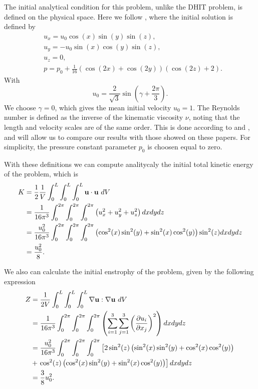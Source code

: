 The initial analytical condition for this problem, unlike the DHIT problem, is defined on the physical space. Here we follow \cite{gassner_accuracy_????}, where the initial solution is defined by
\begin{align}
\label{eq-TGV_initial_condition}
&u_x=u_0\cos(x)\sin(y)\sin(z),\\\nonumber
&u_y=-u_0\sin(x)\cos(y)\sin(z),\\\nonumber
&u_z=0,\\\nonumber
&p=p_0+\frac{1}{16}\left(\cos(2x)+\cos(2y)\right)\left(\cos(2z)+2\right).
\end{align}
With
$$u_0=\frac{2}{\sqrt{3}}\sin\left(\gamma+\frac{2\pi}{3}\right).$$
We choose $\gamma=0$, which gives the mean initial velocity  $u_0=1$. The Reynolds number is defined as the inverse of the kinematic viscosity $\nu$, noting that the length and velocity scales are of the same order. This is done according to \cite{gassner_accuracy_????} and \cite{brachet_direct_1991}, and will allow us to compare our results with those showed on these papers. For simplicity, the pressure constant parameter $p_0$ is choosen equal to zero.

With these definitions we can compute analitycaly the initial total kinetic energy of the problem, which is 
\begin{align}
\label{eq-TGV_initial_energy}
K&=\frac{1}{2}\frac{1}{V}\int_0^L\int_0^L\int_0^L\u\cdot\u\ dV\\\nonumber
&=\frac{1}{16\pi^3}\int_0^{2\pi}\int_0^{2\pi}\int_0^{2\pi}\left(u_x^2+u_y^2+u_z^2\right)dxdydz\\\nonumber
&=\frac{u_0^2}{16\pi^3}\int_0^{2\pi}\int_0^{2\pi}\int_0^{2\pi}\left(\cos^2(x)\sin^2(y)+\sin^2(x)\cos^2(y)\right)\sin^2(z)dxdydz\\\nonumber
&=\frac{u_0^2}{8}.
\end{align}

We also can calculate the initial enstrophy of the problem, given by the following expression
\begin{align}
\label{eq-TGV_wnstrophy}
Z&=\frac{1}{2V}\int_0^L\int_0^L\int_0^L\nabla\u:\nabla\u\ dV\\\nonumber
&=\frac{1}{16\pi^3}\int_0^{2\pi}\int_0^{2\pi}\int_0^{2\pi}\left(\sum_{i=1}^3\sum_{j=1}^3\left(\frac{\partial u_i}{\partial x_j}\right)^2\right)dxdydz\\\nonumber
&=\frac{u_0^2}{16\pi^3}\int_0^{2\pi}\int_0^{2\pi}\int_0^{2\pi}\left[2\sin^2(z)\left(\sin^2(x)\sin^2(y)+\cos^2(x)\cos^2(y)\right)\right.\\\nonumber
&+\left.\cos^2(z)\left(\cos^2(x)\sin^2(y)+\sin^2(x)\cos^2(y)\right)\right]dxdydz\\\nonumber
&=\frac{3}{8}u_0^2.
\end{align}

